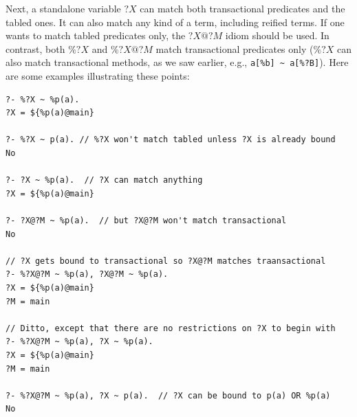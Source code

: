 \documentclass[11pt]{article}
\begin{document}
Next, a standalone variable $?X$ can match both transactional predicates
and the tabled ones. It can also match any kind of a term, including
reified terms. If one wants to match tabled predicates only, the
$?X@?M$ idiom should be used. In contrast, both $\%?X$ and $\%?X@?M$ match
transactional predicates only ($\%?X$ can also match transactional methods,
as we saw earlier, e.g., \verb|a[%b] ~ a[%?B]|).
Here are some examples illustrating these points:
\begin{verbatim}
?- %?X ~ %p(a).
?X = ${%p(a)@main}

?- %?X ~ p(a). // %?X won't match tabled unless ?X is already bound
No

?- ?X ~ %p(a).  // ?X can match anything
?X = ${%p(a)@main}

?- ?X@?M ~ %p(a).  // but ?X@?M won't match transactional
No

// ?X gets bound to transactional so ?X@?M matches traansactional 
?- %?X@?M ~ %p(a), ?X@?M ~ %p(a).
?X = ${%p(a)@main}
?M = main

// Ditto, except that there are no restrictions on ?X to begin with
?- %?X@?M ~ %p(a), ?X ~ %p(a).
?X = ${%p(a)@main}
?M = main

?- %?X@?M ~ %p(a), ?X ~ p(a).  // ?X can be bound to p(a) OR %p(a)
No
\end{verbatim}


\end{document}
